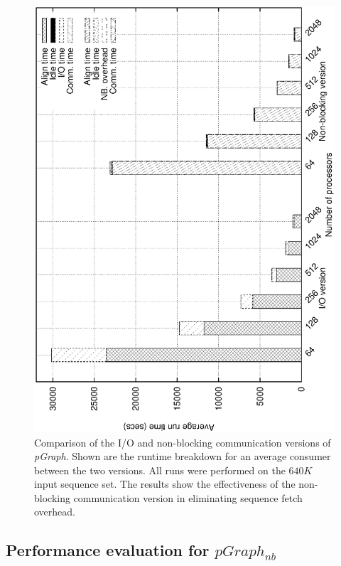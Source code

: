 \documentclass[10pt,journal,letterpaper,compsoc]{IEEEtran}
\begin{document}
\begin{figure}[thb]
\centerline{
						\includegraphics[angle=-90, scale=0.3]{csBreak.eps}
            }
\caption{
Comparison of the I/O and non-blocking communication versions of {\it pGraph}.  Shown are the runtime breakdown for an average consumer between the two versions. All runs were performed on the $640K$ input sequence set. The results show the effectiveness of the non-blocking communication version in eliminating sequence fetch overhead.
}
\label{figConsumerBreakdown}
\end{figure}

\subsection{Performance evaluation for $pGraph_{nb}$}
\label{secPerf}
\end{document}
